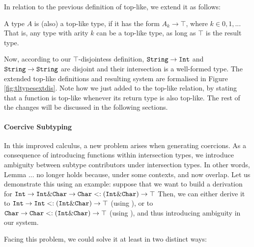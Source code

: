 In relation to the previous definition of top-like, we extend it as follows:
\begin{definition}
  
  A type $A$ is (also) a top-like type, if it has the form $A_k \to \top$, where $k \in {0,1,..}$.
  That is, any type with arity $k$ can be a top-like type, as long as $\top$ is the result type. 

\end{definition}

Now, according to our $\top$-disjointess definition,
$\texttt{String} \to \texttt{Int}$ and $\texttt{String} \to \texttt{String}$ are disjoint and their intersection is a 
well-formed type.
The extended top-like definitions and resulting system are formalised in Figure \ref{fig:tltypesextdis}.
Note how we just added  to the top-like relation, by stating that a function is top-like whenever
its return type is also top-like.
The rest of the changes will be discussed in the following sections.


\paragraph{Coercive Subtyping}

In this improved calculus, a new problem arises when generating coercions. 
As a consequence of introducing functions within intersection types, we introduce ambiguity between subtype contributors 
under intersection types.
In other words, Lemma ... no longer holds because, under some contexts, 
 and  now overlap. 
Let us demonstrate this using an example:
suppose that we want to build a derivation for  
$\texttt{Int} \to \texttt{Int} \& \texttt{Char} \to \texttt{Char} <: (\texttt{Int} \& \texttt{Char}) \to \top$
Then, we can either derive it to $\texttt{Int} \to \texttt{Int} <: (\texttt{Int} \& \texttt{Char}) \to \top$ 
(using ), or to $\texttt{Char} \to \texttt{Char} <: (\texttt{Int} \& \texttt{Char}) \to \top$
(using ), and thus introducing ambiguity in our system.

Facing this problem, we could solve it at least in two distinct ways:

